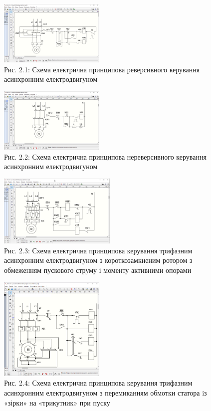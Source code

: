 \documentclass[a4paper]{article}
\begin{document}
\begin{figure}[h]
    \centering
    \includegraphics[width=0.45\textwidth]{imgs/LW2.1.png}
    \caption*{Рис. 2.1: Схема електрична принципова реверсивного керування асинхронним електродвигуном}
\end{figure} 

\begin{figure}[h]
    \centering
    \includegraphics[width=0.45\textwidth]{imgs/LW2.2.png}
    \caption*{Рис. 2.2: Схема електрична принципова нереверсивного керування асинхронним електродвигуном}
\end{figure} 

\begin{figure}[h]
    \centering
    \includegraphics[width=0.5\textwidth]{imgs/LW2.3.png}
    \caption*{Рис. 2.3: Схема електрична принципова керування трифазним асинхронним електродвигуном з короткозамкненим ротором з обмеженням  пускового струму і моменту активними опорами}
\end{figure} 

\begin{figure}[h]
    \centering
    \includegraphics[width=0.45\textwidth]{imgs/LW2.4.png}
    \caption*{Рис. 2.4: Схема електрична принципова керування трифазним асинхронним електродвигуном з перемиканням обмотки статора iз «зірки» на «трикутник» при пуску}
\end{figure}
\end{document}
